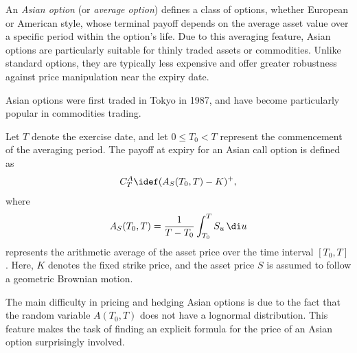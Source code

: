 An \emph{Asian option} (or \emph{average option}) defines a class of options, whether European or American style, whose terminal payoff depends on the average asset value over a specific period within the option's life. Due to this averaging feature, Asian options are particularly suitable for thinly traded assets or commodities. Unlike standard options, they are typically less expensive and offer greater robustness against price manipulation near the expiry date.

Asian options were first traded in Tokyo in 1987, and have become particularly popular in commodities trading.

Let $T$ denote the exercise date, and let $0 \le T_0 < T$ represent the commencement of the averaging period. The payoff at expiry for an Asian call option is defined as
\begin{equation} \label{eq:AsianCallPayoff}
    C_T^A \idef (A_S(T_0, T) - K)^+,
\end{equation}
where
\begin{equation} \label{eq:ArithmeticAverage}
    A_S(T_0, T) = \frac{1}{T - T_0} \int_{T_0}^T S_u \, \di u
\end{equation}
represents the arithmetic average of the asset price over the time interval $[T_0, T]$. Here, $K$ denotes the fixed strike price, and the asset price $S$ is assumed to follow a geometric Brownian motion.

The main difficulty in pricing and hedging Asian options is due to the fact that the random variable $A(T_0, T)$ does not have a lognormal distribution. This feature makes the task of finding an explicit formula for the price of an Asian option surprisingly involved.

